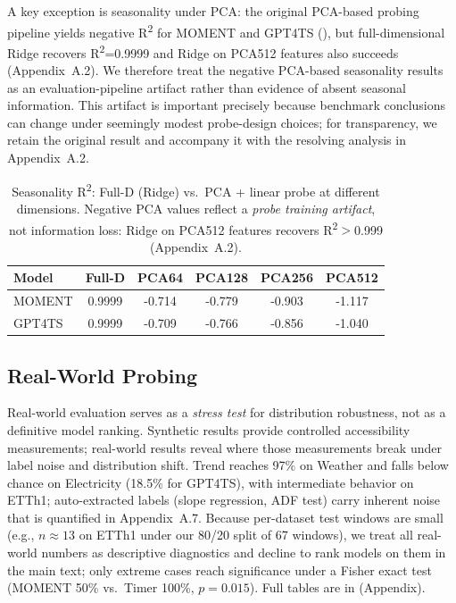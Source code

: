 \documentclass{article}
\begin{document}
A key exception is seasonality under PCA: the original PCA-based probing pipeline yields negative R\textsuperscript{2} for MOMENT and GPT4TS (), but full-dimensional Ridge recovers R\textsuperscript{2}=0.9999 and Ridge on PCA512 features also succeeds (Appendix~A.2). We therefore treat the negative PCA-based seasonality results as an evaluation-pipeline artifact rather than evidence of absent seasonal information. This artifact is important precisely because benchmark conclusions can change under seemingly modest probe-design choices; for transparency, we retain the original result and accompany it with the resolving analysis in Appendix~A.2.

\begin{table}[t!]
\caption{Seasonality R\textsuperscript{2}: Full-D (Ridge) vs.\ PCA + linear probe at different dimensions. Negative PCA values reflect a \emph{probe training artifact}, not information loss: Ridge on PCA512 features recovers R\textsuperscript{2}$>$0.999 (Appendix~A.2).}
\label{tab:full_vs_pca}
\centering
\begin{tabular}{lccccc}
\toprule
Model & Full-D & PCA64 & PCA128 & PCA256 & PCA512 \\
\midrule
MOMENT & 0.9999 & -0.714 & -0.779 & -0.903 & -1.117 \\
GPT4TS & 0.9999 & -0.709 & -0.766 & -0.856 & -1.040 \\
\bottomrule
\end{tabular}
\end{table}

\subsection{Real-World Probing}

Real-world evaluation serves as a \emph{stress test} for distribution robustness, not as a definitive model ranking. Synthetic results provide controlled accessibility measurements; real-world results reveal where those measurements break under label noise and distribution shift. Trend reaches 97\% on Weather and falls below chance on Electricity (18.5\% for GPT4TS), with intermediate behavior on ETTh1; auto-extracted labels (slope regression, ADF test) carry inherent noise that is quantified in Appendix~A.7. Because per-dataset test windows are small (e.g., $n \approx 13$ on ETTh1 under our 80/20 split of 67 windows), we treat all real-world numbers as descriptive diagnostics and decline to rank models on them in the main text; only extreme cases reach significance under a Fisher exact test (MOMENT 50\% vs.\ Timer 100\%, $p = 0.015$). Full tables are in  (Appendix).
\end{document}
